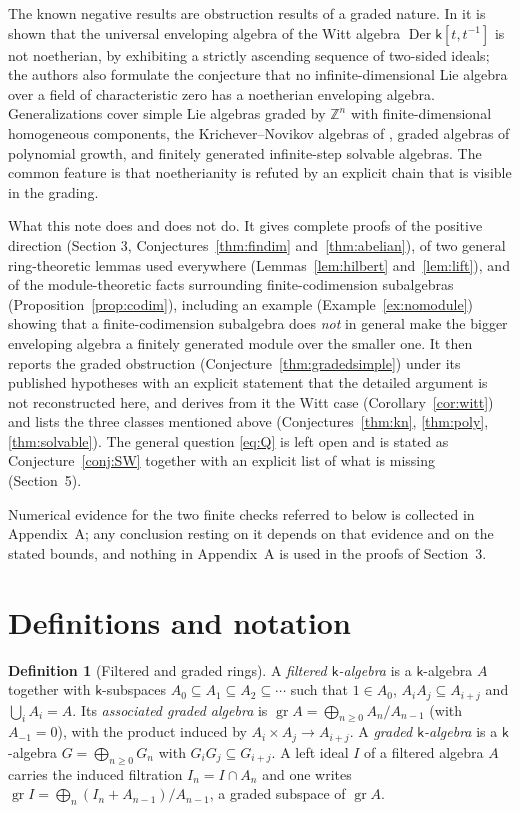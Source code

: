 \documentclass[11pt]{ctexart}
\theoremstyle{plain}
\theoremstyle{definition}
\newtheorem{definition}[theorem]{Definition}
\theoremstyle{remark}
\newcommand{\kk}{\mathsf{k}}
\newcommand{\Der}{\operatorname{Der}}
\begin{document}
The known negative results are obstruction results of a graded nature. In
\cite{SW14} it is shown that the universal enveloping algebra of the Witt algebra
$\Der\kk[t,t^{-1}]$ is not noetherian, by exhibiting a strictly ascending sequence
of two-sided ideals; the authors also formulate the conjecture that no
infinite-dimensional Lie algebra over a field of characteristic zero has a
noetherian enveloping algebra. Generalizations cover simple Lie algebras graded by
$\mathbb{Z}^n$ with finite-dimensional homogeneous components, the
Krichever--Novikov algebras of \cite{KN87}, graded algebras of polynomial growth,
and finitely generated infinite-step solvable algebras. The common feature is
that noetherianity is refuted by an explicit chain that is visible in the grading.

What this note does and does not do. It gives complete proofs of the positive
direction (Section 3, Conjectures~\ref{thm:findim} and~\ref{thm:abelian}), of two
general ring-theoretic lemmas used everywhere (Lemmas~\ref{lem:hilbert}
and~\ref{lem:lift}), and of the module-theoretic facts surrounding
finite-codimension subalgebras (Proposition~\ref{prop:codim}), including an example
(Example~\ref{ex:nomodule}) showing that a finite-codimension subalgebra does
\emph{not} in general make the bigger enveloping algebra a finitely generated module
over the smaller one. It then reports the graded obstruction
(Conjecture~\ref{thm:gradedsimple}) under its published hypotheses with an explicit
statement that the detailed argument is not reconstructed here, and derives from it
the Witt case (Corollary~\ref{cor:witt}) and lists the three classes mentioned above
(Conjectures~\ref{thm:kn}, \ref{thm:poly}, \ref{thm:solvable}). The general question
\eqref{eq:Q} is left open and is stated as Conjecture~\ref{conj:SW} together with an
explicit list of what is missing (Section~5).

Numerical evidence for the two finite checks referred to below is collected in
Appendix~A; any conclusion resting on it depends on that evidence and on the stated
bounds, and nothing in Appendix~A is used in the proofs of Section~3.

\section{Definitions and notation}\label{sec:defs}

\begin{definition}[Filtered and graded rings]\label{def:filtered}
A \emph{filtered $\kk$-algebra} is a $\kk$-algebra $A$ together with $\kk$-subspaces
$A_0\subseteq A_1\subseteq A_2\subseteq\cdots$ such that $1\in A_0$,
$A_iA_j\subseteq A_{i+j}$ and $\bigcup_i A_i=A$. Its \emph{associated graded algebra}
is $\operatorname{gr}A=\bigoplus_{n\ge0}A_n/A_{n-1}$ (with $A_{-1}=0$), with the
product induced by $A_i\times A_j\to A_{i+j}$. A \emph{graded $\kk$-algebra} is a
$\kk$-algebra $G=\bigoplus_{n\ge0}G_n$ with $G_iG_j\subseteq G_{i+j}$.
A left ideal $I$ of a filtered algebra $A$ carries the induced filtration
$I_n=I\cap A_n$ and one writes $\operatorname{gr}I=\bigoplus_n (I_n+A_{n-1})/A_{n-1}$,
a graded subspace of $\operatorname{gr}A$.
\end{definition}
\end{document}
